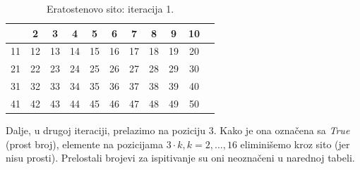 
\begin{table}[H]
	\centering
	\begin{tabular}{|c|c|c|c|c|c|c|c|c|c|c} \hline
		& 2 & 3 & \cellcolor{red!30}  4 & 5 & \cellcolor{red!30} 6 & 7 & \cellcolor{red!30} 8 & 9 & \cellcolor{red!30} 10 \\ \hline
		11 &\cellcolor{red!30}  12 & 13 & \cellcolor{red!30} 14 & 15 & \cellcolor{red!30} 16 & 17 & \cellcolor{red!30} \cellcolor{red!30} 18 & 19 & \cellcolor{red!30} \cellcolor{red!30} 20 \\ \hline
		21 & \cellcolor{red!30} 22 & 23 & \cellcolor{red!30} 24 & 25 & \cellcolor{red!30} 26 & 27 &\cellcolor{red!30}  28 & 29 & \cellcolor{red!30} \cellcolor{red!30} 30 \\ \hline
		31 & \cellcolor{red!30} 32 & 33 & \cellcolor{red!30} 34 & 35 & \cellcolor{red!30} 36 & 37 & \cellcolor{red!30} 38 & 39 & \cellcolor{red!30} 40 \\ \hline
		41 & \cellcolor{red!30} 42 & 43 & \cellcolor{red!30} 44 & 45 & \cellcolor{red!30} 46 & 47 &\cellcolor{red!30}  48 & 49 &\cellcolor{red!30}  50 \\ \hline     
	\end{tabular}
        \caption{Eratostenovo sito: iteracija 1.} \label{eratosten-sieve-it-1}
\end{table}



Dalje, u drugoj iteraciji, prelazimo na poziciju 3. Kako je ona označena sa \emph{True} (prost broj), elemente na pozicijama $3\cdot k, k=2, \ldots, 16$ eliminišemo kroz sito (jer nisu prosti). Prelostali brojevi za ispitivanje su oni neoznačeni u narednoj tabeli. 


